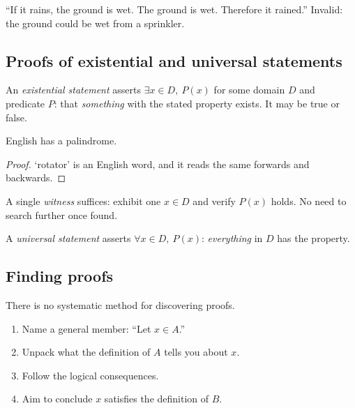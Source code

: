 \documentclass[11pt]{article}
\begin{document}
\begin{example}
``If it rains, the ground is wet. The ground is wet. Therefore it rained.'' Invalid: the ground could be wet from a sprinkler.
\end{example}

\subsection{Proofs of existential and universal statements}
\label{sec:3-3}

\begin{definition}
An \emph{existential statement} asserts $\exists x \in D,\ P(x)$ for some domain $D$ and predicate $P$: that \emph{something} with the stated property exists. It may be true or false.
\end{definition}

\begin{theorem}
English has a palindrome.
\end{theorem}
\begin{proof}
`rotator' is an English word, and it reads the same forwards and backwards.
\end{proof}

\begin{note}
A single \emph{witness} suffices: exhibit one $x \in D$ and verify $P(x)$ holds. No need to search further once found.
\end{note}

\begin{definition}
A \emph{universal statement} asserts $\forall x \in D,\ P(x)$: \emph{everything} in $D$ has the property.
\end{definition}

\subsection{Finding proofs}
\label{sec:3-4}

\begin{note}
There is no systematic method for discovering proofs.
\end{note}

\begin{note}
\begin{enumerate}[label=\arabic*.]
    \item Name a general member: ``Let $x \in A$.''
    \item Unpack what the definition of $A$ tells you about $x$.
    \item Follow the logical consequences.
    \item Aim to conclude $x$ satisfies the definition of $B$.
\end{enumerate}
\end{note}
\end{document}
